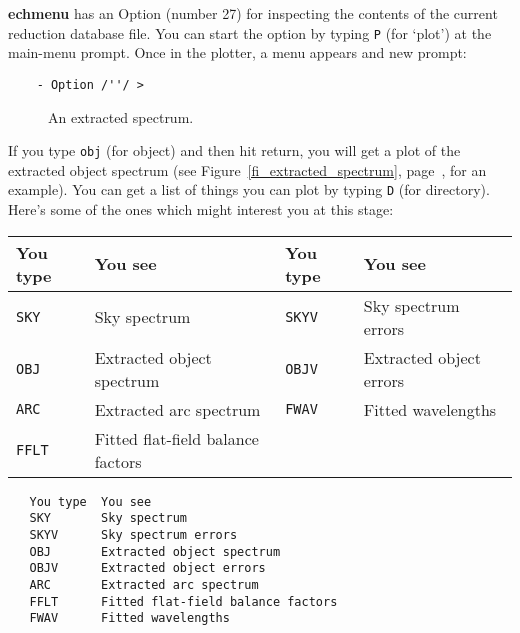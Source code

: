 \documentclass[twoside,11pt]{article}
\newenvironment{latexonly}{}{}
\newcommand{\xref}[3]{#1}
\newcommand{\scspec}[2]{#1}
\newcommand{\scspec}[2]{#2}
\begin{document}
\xref{{\bf echmenu}}{sun152}{ECHMENU} has an
\xref{Option (number 27)}{sun152}{option27}
for inspecting the contents of the current reduction database file.
You can start the option by typing \verb+P+ (for `plot') at the
main-menu prompt.
Once in the plotter, a menu appears and new prompt:

{
\scspec{\small}{ }
\begin{verbatim}
    - Option /''/ >
\end{verbatim}
}

\begin{htmlonly}
\begin{figure}
\begin{center}
  \leavevmode\epsfysize=136mm
  \parbox{140mm}{
    \caption{An extracted spectrum.}
    \label{fi_extracted_spectrum_again}
  }
\end{center}
\end{figure}
\end{htmlonly}

If you type \verb+obj+ (for object) and then hit return, you will get a
plot of the extracted object spectrum (see
\scspec{Figure~\ref{fi_extracted_spectrum},
page~\pageref{fi_extracted_spectrum},}{the figure above} for an example).
You can get a list of things you
can plot by typing \verb+D+ (for directory).  Here's some of the ones which
might interest you at this stage:

\begin{latexonly}
\begin{center}
\begin{tabular}{llll}
 You type & You see & You type & You see\\ \hline
 {\tt SKY}  & Sky spectrum & {\tt SKYV} & Sky spectrum errors\\
 {\tt OBJ}  & Extracted object spectrum & {\tt OBJV} & Extracted object errors\\
 {\tt ARC}  & Extracted arc spectrum & {\tt FWAV} & Fitted wavelengths\\
 {\tt FFLT} & Fitted flat-field balance factors\\ \hline
\end{tabular}
\end{center}
\end{latexonly}
\begin{htmlonly}
\begin{verbatim}
   You type  You see
   SKY       Sky spectrum
   SKYV      Sky spectrum errors
   OBJ       Extracted object spectrum
   OBJV      Extracted object errors
   ARC       Extracted arc spectrum
   FFLT      Fitted flat-field balance factors
   FWAV      Fitted wavelengths
\end{verbatim}
\end{htmlonly}
\end{document}
